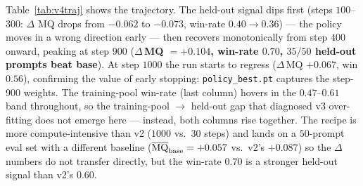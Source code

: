 \documentclass{article}
\begin{document}
Table~\ref{tab:v4traj} shows the trajectory. The held-out signal dips first (steps $100$--$300$: $\Delta$ MQ drops from $-0.062$ to $-0.073$, win-rate $0.40\to0.36$) — the policy moves in a wrong direction early — then recovers monotonically from step $400$ onward, peaking at step $900$ (\textbf{$\Delta$\,MQ $=+0.104$, win-rate $0.70$, $35/50$ held-out prompts beat base}). At step $1000$ the run starts to regress ($\Delta$\,MQ $+0.067$, win $0.56$), confirming the value of early stopping: \texttt{policy\_best.pt} captures the step-900 weights. The training-pool win-rate (last column) hovers in the $0.47$--$0.61$ band throughout, so the training-pool $\!\to\!$ held-out gap that diagnosed v3 over-fitting does not emerge here — instead, both columns rise together. The recipe is more compute-intensive than v2 ($1000$ vs.\ $30$ steps) and lands on a $50$-prompt eval set with a different baseline ($\overline{\rm MQ}_{\rm base} = +0.057$ vs.\ v2's $+0.087$) so the $\Delta$ numbers do not transfer directly, but the win-rate $0.70$ is a stronger held-out signal than v2's $0.60$.
\end{document}
